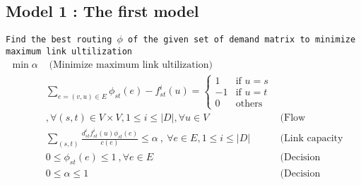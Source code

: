 \documentclass{ctexart}
\begin{document}
\subsection{Model 1 : The first model}
\texttt{Find the best routing $\phi$ of the given set of demand matrix to minimize maximum link ultilization} 
\begin{equation}
	\begin{aligned}
		\min \alpha & \text{  (Minimize maximum link ultilization)}\\
		& \sum_{e=(v,u)\in E}\phi_{st}(e)-f_{st}^i(u)=\begin{cases}
			1 &\text{if } u=s \\
			-1 &\text{if } u=t \\
			0 &\text{others} 
		 \end{cases}\\
		& ,\forall (s,t)\in V\times V,1\leq i\leq|\textit{D}| , \forall u\in V & \text{(Flow conservation)}\\
		& \sum_{(s,t)}\frac{
			d_{st}^if_{st}^i(u)\phi_{st}(e)}{c(e)} \leq \alpha\ ,\ \forall e\in E,1\leq i\leq|\textit{D}| &  \text{(Link capacity constraint)} \\
		& 0\leq\phi_{st}(e)\leq1\ ,\forall e\in E\ & \text{(Decision variable constraint)}\\
		& 0\leq\alpha\leq1\ & \text{(Decision variable constraint)}
	\end{aligned}
\end{equation}
\end{document}
